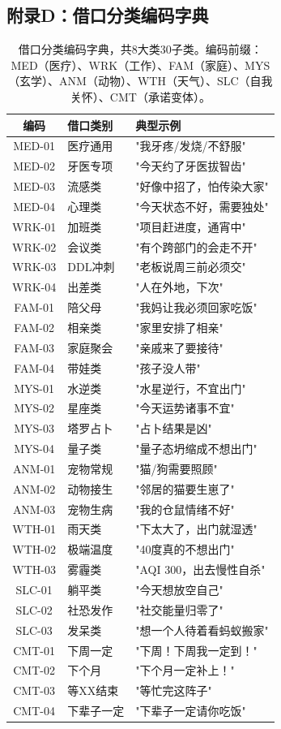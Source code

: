 \documentclass[journal]{IEEEtran}
\begin{document}
\subsection*{附录D：借口分类编码字典}
\label{app:excuse_coding}

\begin{table}[ht]
\begin{center}
\footnotesize
\begin{tabular}{cll}
\toprule
编码 & 借口类别 & 典型示例 \\
\midrule
MED-01 & 医疗通用 & "我牙疼/发烧/不舒服" \\
MED-02 & 牙医专项 & "今天约了牙医拔智齿" \\
MED-03 & 流感类 & "好像中招了，怕传染大家" \\
MED-04 & 心理类 & "今天状态不好，需要独处" \\
\midrule
WRK-01 & 加班类 & "项目赶进度，通宵中" \\
WRK-02 & 会议类 & "有个跨部门的会走不开" \\
WRK-03 & DDL冲刺 & "老板说周三前必须交" \\
WRK-04 & 出差类 & "人在外地，下次" \\
\midrule
FAM-01 & 陪父母 & "我妈让我必须回家吃饭" \\
FAM-02 & 相亲类 & "家里安排了相亲" \\
FAM-03 & 家庭聚会 & "亲戚来了要接待" \\
FAM-04 & 带娃类 & "孩子没人带" \\
\midrule
MYS-01 & 水逆类 & "水星逆行，不宜出门" \\
MYS-02 & 星座类 & "今天运势诸事不宜" \\
MYS-03 & 塔罗占卜 & "占卜结果是凶" \\
MYS-04 & 量子类 & "量子态坍缩成不想出门" \\
\midrule
ANM-01 & 宠物常规 & "猫/狗需要照顾" \\
ANM-02 & 动物接生 & "邻居的猫要生崽了" \\
ANM-03 & 宠物生病 & "我的仓鼠情绪不好" \\
\midrule
WTH-01 & 雨天类 & "下太大了，出门就湿透" \\
WTH-02 & 极端温度 & "40度真的不想出门" \\
WTH-03 & 雾霾类 & "AQI 300，出去慢性自杀" \\
\midrule
SLC-01 & 躺平类 & "今天想放空自己" \\
SLC-02 & 社恐发作 & "社交能量归零了" \\
SLC-03 & 发呆类 & "想一个人待着看蚂蚁搬家" \\
\midrule
CMT-01 & 下周一定 & "下周！下周我一定到！" \\
CMT-02 & 下个月 & "下个月一定补上！" \\
CMT-03 & 等XX结束 & "等忙完这阵子" \\
CMT-04 & 下辈子一定 & "下辈子一定请你吃饭" \\
\bottomrule
\end{tabular}
\end{center}
\caption{借口分类编码字典，共8大类30子类。编码前缀：MED（医疗）、WRK（工作）、FAM（家庭）、MYS（玄学）、ANM（动物）、WTH（天气）、SLC（自我关怀）、CMT（承诺变体）。}
\label{tab:excuse_dict}
\end{table}
\normalsize
\end{document}
